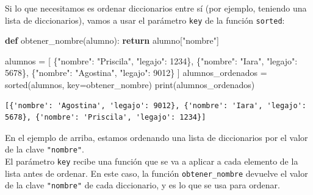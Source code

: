 \documentclass[
  letterpaper,
  DIV=11,
  numbers=noendperiod]{scrreprt}
\newenvironment{Shaded}{\begin{snugshade}}{\end{snugshade}}
\newcommand{\BuiltInTok}[1]{\textcolor[rgb]{0.00,0.23,0.31}{#1}}
\newcommand{\ControlFlowTok}[1]{\textcolor[rgb]{0.00,0.23,0.31}{\textbf{#1}}}
\newcommand{\DecValTok}[1]{\textcolor[rgb]{0.68,0.00,0.00}{#1}}
\newcommand{\KeywordTok}[1]{\textcolor[rgb]{0.00,0.23,0.31}{\textbf{#1}}}
\newcommand{\NormalTok}[1]{\textcolor[rgb]{0.00,0.23,0.31}{#1}}
\newcommand{\OperatorTok}[1]{\textcolor[rgb]{0.37,0.37,0.37}{#1}}
\newcommand{\StringTok}[1]{\textcolor[rgb]{0.13,0.47,0.30}{#1}}
\begin{document}
Si lo que necesitamos es ordenar diccionarios entre sí (por ejemplo,
teniendo una lista de diccionarios), vamos a usar el parámetro
\texttt{key} de la función \texttt{sorted}:

\begin{Shaded}
\begin{Highlighting}[]
\KeywordTok{def}\NormalTok{ obtener\_nombre(alumno):}
  \ControlFlowTok{return}\NormalTok{ alumno[}\StringTok{"nombre"}\NormalTok{]}

\NormalTok{alumnos }\OperatorTok{=}\NormalTok{ [}
\NormalTok{  \{}\StringTok{"nombre"}\NormalTok{: }\StringTok{"Priscila"}\NormalTok{, }\StringTok{"legajo"}\NormalTok{: }\DecValTok{1234}\NormalTok{\},}
\NormalTok{  \{}\StringTok{"nombre"}\NormalTok{: }\StringTok{"Iara"}\NormalTok{, }\StringTok{"legajo"}\NormalTok{: }\DecValTok{5678}\NormalTok{\},}
\NormalTok{  \{}\StringTok{"nombre"}\NormalTok{: }\StringTok{"Agostina"}\NormalTok{, }\StringTok{"legajo"}\NormalTok{: }\DecValTok{9012}\NormalTok{\}}
\NormalTok{]}
\NormalTok{alumnos\_ordenados }\OperatorTok{=} \BuiltInTok{sorted}\NormalTok{(alumnos, key}\OperatorTok{=}\NormalTok{obtener\_nombre)}
\BuiltInTok{print}\NormalTok{(alumnos\_ordenados)}
\end{Highlighting}
\end{Shaded}

\begin{verbatim}
[{'nombre': 'Agostina', 'legajo': 9012}, {'nombre': 'Iara', 'legajo': 5678}, {'nombre': 'Priscila', 'legajo': 1234}]
\end{verbatim}

\begin{tcolorbox}[enhanced jigsaw, opacitybacktitle=0.6, toptitle=1mm, toprule=.15mm, arc=.35mm, breakable, bottomrule=.15mm, opacityback=0, leftrule=.75mm, rightrule=.15mm, title=\textcolor{quarto-callout-note-color}{\faInfo}\hspace{0.5em}{Note}, left=2mm, bottomtitle=1mm, colframe=quarto-callout-note-color-frame, colback=white, titlerule=0mm, coltitle=black, colbacktitle=quarto-callout-note-color!10!white]

En el ejemplo de arriba, estamos ordenando una lista de diccionarios por
el valor de la clave \texttt{"nombre"}.\\
El parámetro \texttt{key} recibe una función que se va a aplicar a cada
elemento de la lista antes de ordenar. En este caso, la función
\texttt{obtener\_nombre} devuelve el valor de la clave \texttt{"nombre"}
de cada diccionario, y es lo que se usa para ordenar.

\end{tcolorbox}
\end{document}

